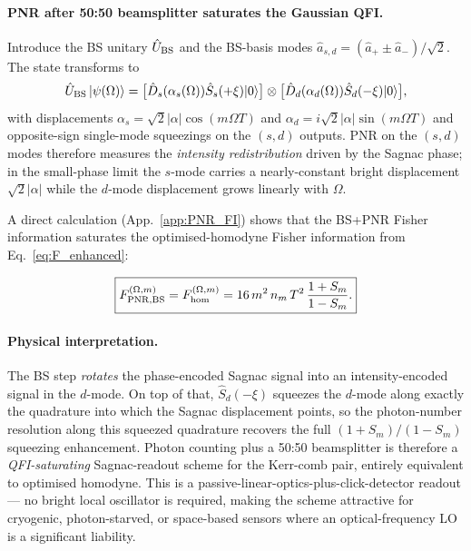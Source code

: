 \documentclass[11pt]{article}
\begin{document}
\paragraph{PNR after 50:50 beamsplitter saturates the Gaussian QFI.}
Introduce the BS unitary $\hat U_{\rm BS}$ and the BS-basis modes
$\hat a_{s,d} = (\hat a_+\pm \hat a_-)/\sqrt2$.  The state
transforms to
\begin{equation}
  \hat U_{\rm BS}\,|\psi(\Omega)\rangle
  = \bigl[\hat D_s(\alpha_s(\Omega))\hat S_s(+\xi)|0\rangle\bigr]
    \otimes
    \bigl[\hat D_d(\alpha_d(\Omega))\hat S_d(-\xi)|0\rangle\bigr],
\end{equation}
with displacements
$\alpha_s = \sqrt2|\alpha|\cos(m\Omega T)$ and
$\alpha_d = i\sqrt2|\alpha|\sin(m\Omega T)$ and opposite-sign
single-mode squeezings on the $(s,d)$ outputs.  PNR on the $(s,d)$
modes therefore measures the \emph{intensity redistribution} driven
by the Sagnac phase; in the small-phase limit the $s$-mode carries
a nearly-constant bright displacement $\sqrt2|\alpha|$ while the
$d$-mode displacement grows linearly with $\Omega$.

A direct calculation (App.~\ref{app:PNR_FI}) shows that the BS+PNR
Fisher information saturates the optimised-homodyne Fisher information
from Eq.~\eqref{eq:F_enhanced}:
\begin{keyresult}
\begin{equation}
  \boxed{
  F_{\rm PNR,BS}^{(\Omega,m)} = F_{\rm hom}^{(\Omega,m)}
  = 16\,m^2\,n_m\,T^2\,\frac{1+S_m}{1-S_m}.}
  \label{eq:F_PNR_equals_hom}
\end{equation}
\end{keyresult}

\paragraph{Physical interpretation.}  The BS step \emph{rotates} the
phase-encoded Sagnac signal into an intensity-encoded signal in the
$d$-mode.  On top of that, $\hat S_d(-\xi)$ squeezes the $d$-mode
along exactly the quadrature into which the Sagnac displacement
points, so the photon-number resolution along this squeezed
quadrature recovers the full $(1+S_m)/(1-S_m)$ squeezing
enhancement.  Photon counting plus a 50:50 beamsplitter is therefore
a \emph{QFI-saturating} Sagnac-readout scheme for the Kerr-comb
pair, entirely equivalent to optimised homodyne.  This is a
passive-linear-optics-plus-click-detector readout --- no bright
local oscillator is required, making the scheme attractive for
cryogenic, photon-starved, or space-based sensors where an
optical-frequency LO is a significant liability.
\end{document}
